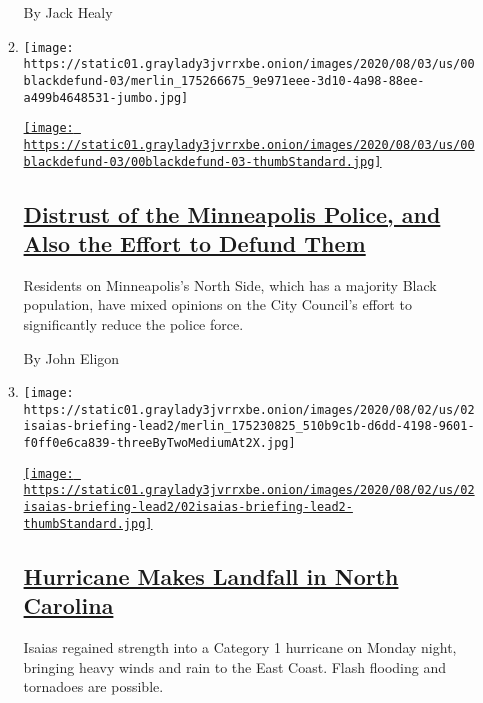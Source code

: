 \begin{enumerate}
\begin{enumerate}
    By Jack Healy
  \item
    \texttt{[image: https://static01.graylady3jvrrxbe.onion/images/2020/08/03/us/00blackdefund-03/merlin\_175266675\_9e971eee-3d10-4a98-88ee-a499b4648531-jumbo.jpg]}

    \href{/2020/08/04/us/minneapolis-defund-police.html}{\texttt{[image: https://static01.graylady3jvrrxbe.onion/images/2020/08/03/us/00blackdefund-03/00blackdefund-03-thumbStandard.jpg]}}

    \hypertarget{distrust-of-the-minneapolis-police-and-also-the-effort-to-defund-them}{%
    \subsection{\texorpdfstring{\href{/2020/08/04/us/minneapolis-defund-police.html}{Distrust
    of the Minneapolis Police, and Also the Effort to Defund
    Them}}{Distrust of the Minneapolis Police, and Also the Effort to Defund Them}}\label{distrust-of-the-minneapolis-police-and-also-the-effort-to-defund-them}}

    Residents on Minneapolis's North Side, which has a majority Black
    population, have mixed opinions on the City Council's effort to
    significantly reduce the police force.

    By John Eligon
  \item
    \texttt{[image: https://static01.graylady3jvrrxbe.onion/images/2020/08/02/us/02isaias-briefing-lead2/merlin\_175230825\_510b9c1b-d6dd-4198-9601-f0ff0e6ca839-threeByTwoMediumAt2X.jpg]}

    \href{/2020/08/03/us/isaias-storm-updates.html}{\texttt{[image: https://static01.graylady3jvrrxbe.onion/images/2020/08/02/us/02isaias-briefing-lead2/02isaias-briefing-lead2-thumbStandard.jpg]}}

    \hypertarget{hurricane-makes-landfall-in-north-carolina}{%
    \subsection{\texorpdfstring{\href{/2020/08/03/us/isaias-storm-updates.html}{Hurricane
    Makes Landfall in North
    Carolina}}{Hurricane Makes Landfall in North Carolina}}\label{hurricane-makes-landfall-in-north-carolina}}

    Isaias regained strength into a Category 1 hurricane on Monday
    night, bringing heavy winds and rain to the East Coast. Flash
    flooding and tornadoes are possible.
  \end{enumerate}
\end{enumerate}

